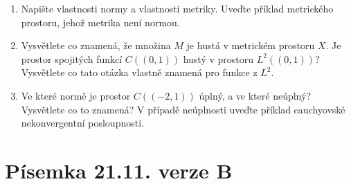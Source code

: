 \documentclass[a4paper,10pt]{article}
\begin{document}
\begin{enumerate}
\item Napište vlastnosti normy a vlastnosti metriky. Uveďte příklad metrického prostoru, jehož metrika není normou.

\item Vysvětlete co znamená, že množina $M$ je hustá v metrickém prostoru $X$. Je prostor spojitých funkcí $C((0,1))$ hustý v prostoru $L^2((0,1))$?
      Vysvětlete co tato otázka vlastně znamená pro funkce z $L^2$.

\item Ve které normě je prostor $C((-2,1))$ úplný, a ve které neúplný? Vysvětlete co to znamená? V případě neúplnosti uveďte příklad cauchyovské nekonvergentní posloupnosti.

\end{enumerate}

\pagebreak
\section{Písemka 21.11. verze B}
\end{document}
